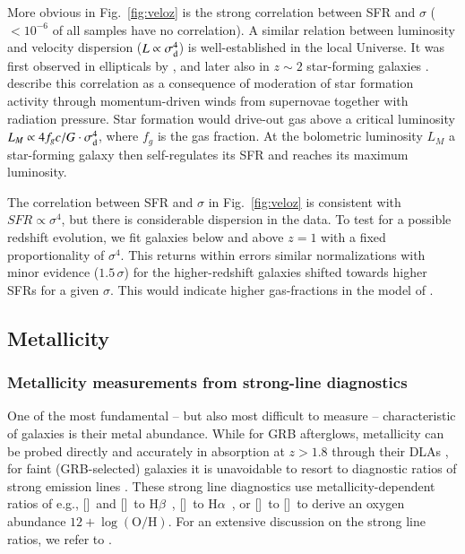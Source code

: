 \documentclass[traditabstract, longauth]{aa}
\newcommand{\hb}{H$\beta$}
\newcommand{\ha}{H$\alpha$}
\newcommand{\oh}{12+\log(\mathrm{O/H})}
\newcommand{\oii}{[\ion{O}{ii}]}
\newcommand{\oiii}{[\ion{O}{iii}]}
\newcommand{\nii}{[\ion{N}{ii}]}
\begin{document}
More obvious in Fig.~\ref{fig:veloz} is the strong correlation between SFR and $\sigma$ ($<10^{-6}$ of all samples have no correlation). A similar relation between luminosity and velocity dispersion ($L\propto\sigma_{\rm{d}}^{4}$) is well-established in the local Universe. It was first observed in ellipticals by \citet{1976ApJ...204..668F}, and later also in $z\sim2$ star-forming galaxies \citep{2006ApJ...646..107E}. \citet{2005ApJ...618..569M} describe this correlation as a consequence of moderation of star formation activity through momentum-driven winds from supernovae together with radiation pressure. Star formation would drive-out gas above a critical luminosity $L_{M} \propto 4f_{g}c/G\cdot\sigma_{\rm{d}}^{4}$, where $f_g$ is the gas fraction. At the bolometric luminosity $L_M$ a star-forming galaxy then self-regulates its SFR and reaches its maximum luminosity.

The correlation between SFR and $\sigma$ in Fig.~\ref{fig:veloz} is consistent with $SFR \propto \sigma^4$, but there is considerable dispersion in the data. To test for a possible redshift evolution, we fit galaxies below and above $z=1$ with a fixed proportionality of $\sigma^4$. This returns within errors similar normalizations with minor evidence ($1.5\,\sigma$) for the higher-redshift galaxies shifted towards higher SFRs for a given $\sigma$. This would indicate higher gas-fractions in the model of \citet{2005ApJ...618..569M}.


\subsection{Metallicity}
\label{sec:met}

\subsubsection{Metallicity measurements from strong-line diagnostics}

One of the most fundamental -- but also most difficult to measure -- characteristic of galaxies is their metal abundance. While for GRB afterglows, metallicity can be probed directly and accurately in absorption at $z>1.8$ through their DLAs \citep[e.g.,][]{2004A&A...419..927V, 2006NJPh....8..195S, 2007ApJ...666..267P, 2009A&A...506..661L}, for faint (GRB-selected) galaxies it is unavoidable to resort to diagnostic ratios of strong emission lines \citep[e.g.,][]{2006ApJ...644..813E, 2008A&A...488..463M}. These strong line diagnostics use metallicity-dependent ratios of e.g., \oii\, and \oiii\, to \hb\, \citep[e.g.,][]{1979MNRAS.189...95P, 1991ApJ...380..140M, 1994ApJ...420...87Z}, \nii\, to \ha\, \citep{1979A&A....78..200A, 2004MNRAS.348L..59P}, or \nii\, to \oii\, \citep[e.g.,][]{2002ApJS..142...35K} to derive an oxygen abundance $\oh$. For an extensive discussion on the strong line ratios, we refer to \citet{2002ApJS..142...35K}.
 
\end{document}
